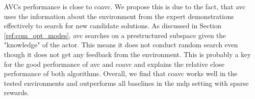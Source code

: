 AVCs performance is close to \ac{coavc}. We propose this is due to the fact, that \ac{avc} uses the information about the environment 
from the expert demonstrations effectively to search for new candidate solutions. As discussed in Section \ref{ref:com_opt_modes}, \ac{avc} searches on a prestructured subspace given the "knowledge" of the 
actor. This means it does not conduct random search even though it does not get any feedback from the environment. This is probably a key for the good performance of \ac{avc} and \ac{coavc} and explains 
the relative close performance of both algorithms. Overall, we find that \ac{coavc} works well in the tested environments and outperforms all baselines in the \ac{mdp} setting with sparse rewards.